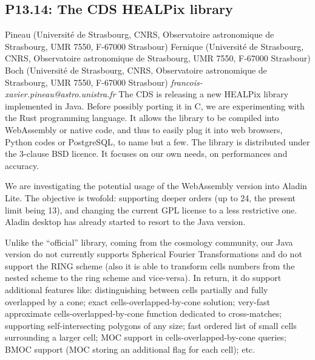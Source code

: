 \documentclass{report}
\begin{document}
\subsection*{P13.14: The CDS HEALPix library}
\bigskip
Pineau (Université de Strasbourg, CNRS, Observatoire astronomique de Strasbourg, UMR 7550, F-67000 Strasbour) \newline Fernique (Université de Strasbourg, CNRS, Observatoire astronomique de Strasbourg, UMR 7550, F-67000 Strasbour) \newline  Boch (Université de Strasbourg, CNRS, Observatoire astronomique de Strasbourg, UMR 7550, F-67000 Strasbour)\newline   \newline  \newline  \newline\newline
{\it francois-xavier.pineau@astro.unistra.fr}\newline
\newline\newline
The CDS is releasing a new HEALPix library implemented in Java.  
Before possibly porting it in C, we are experimenting with the Rust programming language. It allows the library to be compiled into WebAssembly or native code, and thus to easily plug it into web browsers, Python codes or PostgreSQL, to name but a few.
The library is distributed under the 3-clause BSD licence.
It focuses on our own needs, on performances and accuracy.


We are investigating the potential usage of the WebAssembly version into Aladin Lite. The objective is twofold: supporting deeper orders (up to 24, the present limit being 13), and changing the current GPL license to a less restrictive one.
Aladin desktop has already started to resort to the Java version.


Unlike the ``official'' library, coming from the cosmology community, our Java version do not currently supports Spherical Fourier Transformations and do not support the RING scheme (also it is able to transform cells numbers from the nested scheme to the ring scheme and vice-versa).
In return, it do support additional features like: distinguishing between cells partially and fully overlapped by a cone; exact cells-overlapped-by-cone solution; very-fast approximate cells-overlapped-by-cone function dedicated to cross-matches; supporting self-intersecting polygons of any size; fast ordered list of small cells surrounding a larger cell; MOC support in cells-overlapped-by-cone queries; BMOC support (MOC storing an additional flag for each cell); etc.\newline
\newpage
\end{document}
